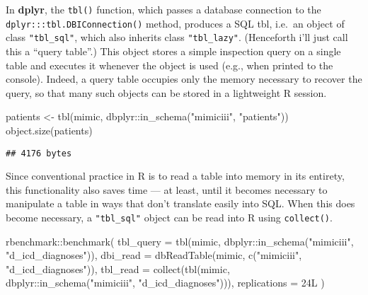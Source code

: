 \documentclass[
]{article}
\newenvironment{Shaded}{\begin{snugshade}}{\end{snugshade}}
\newcommand{\AttributeTok}[1]{\textcolor[rgb]{0.77,0.63,0.00}{#1}}
\newcommand{\FunctionTok}[1]{\textcolor[rgb]{0.00,0.00,0.00}{#1}}
\newcommand{\NormalTok}[1]{#1}
\newcommand{\OtherTok}[1]{\textcolor[rgb]{0.56,0.35,0.01}{#1}}
\newcommand{\SpecialCharTok}[1]{\textcolor[rgb]{0.00,0.00,0.00}{#1}}
\newcommand{\StringTok}[1]{\textcolor[rgb]{0.31,0.60,0.02}{#1}}
\begin{document}
In \textbf{dplyr}, the \texttt{tbl()} function, which passes a database
connection to the \texttt{dplyr:::tbl.DBIConnection()} method, produces
a SQL tbl, i.e.~an object of class \texttt{"tbl\_sql"}, which also
inherits class \texttt{"tbl\_lazy"}. (Henceforth i'll just call this a
``query table''.) This object stores a simple inspection query on a
single table and executes it whenever the object is used (e.g., when
printed to the console). Indeed, a query table occupies only the memory
necessary to recover the query, so that many such objects can be stored
in a lightweight R session.

\begin{Shaded}
\begin{Highlighting}[]
\NormalTok{patients }\OtherTok{\textless{}{-}} \FunctionTok{tbl}\NormalTok{(mimic, dbplyr}\SpecialCharTok{::}\FunctionTok{in\_schema}\NormalTok{(}\StringTok{"mimiciii"}\NormalTok{, }\StringTok{"patients"}\NormalTok{))}
\FunctionTok{object.size}\NormalTok{(patients)}
\end{Highlighting}
\end{Shaded}

\begin{verbatim}
## 4176 bytes
\end{verbatim}

Since conventional practice in R is to read a table into memory in its
entirety, this functionality also saves time --- at least, until it
becomes necessary to manipulate a table in ways that don't translate
easily into SQL. When this does become necessary, a \texttt{"tbl\_sql"}
object can be read into R using \texttt{collect()}.

\begin{Shaded}
\begin{Highlighting}[]
\NormalTok{rbenchmark}\SpecialCharTok{::}\FunctionTok{benchmark}\NormalTok{(}
  \AttributeTok{tbl\_query =} \FunctionTok{tbl}\NormalTok{(mimic, dbplyr}\SpecialCharTok{::}\FunctionTok{in\_schema}\NormalTok{(}\StringTok{"mimiciii"}\NormalTok{, }\StringTok{"d\_icd\_diagnoses"}\NormalTok{)),}
  \AttributeTok{dbi\_read =} \FunctionTok{dbReadTable}\NormalTok{(mimic, }\FunctionTok{c}\NormalTok{(}\StringTok{"mimiciii"}\NormalTok{, }\StringTok{"d\_icd\_diagnoses"}\NormalTok{)),}
  \AttributeTok{tbl\_read =} \FunctionTok{collect}\NormalTok{(}\FunctionTok{tbl}\NormalTok{(mimic, dbplyr}\SpecialCharTok{::}\FunctionTok{in\_schema}\NormalTok{(}\StringTok{"mimiciii"}\NormalTok{, }\StringTok{"d\_icd\_diagnoses"}\NormalTok{))),}
  \AttributeTok{replications =}\NormalTok{ 24L}
\NormalTok{)}
\end{Highlighting}
\end{Shaded}
\end{document}

